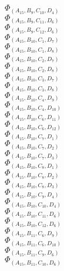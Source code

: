 \documentclass[14pt]{article}
\begin{document}
    $\Phi_{({A}_{15}, {B}_{9}, {C}_{10}, {D}_{4})}$ \\ 
    $\Phi_{({A}_{15}, {B}_{9}, {C}_{11}, {D}_{6})}$ \\ 
    $\Phi_{({A}_{15}, {B}_{9}, {C}_{12}, {D}_{6})}$ \\ 
    $\Phi_{({A}_{15}, {B}_{10}, {C}_{1}, {D}_{7})}$ \\ 
    $\Phi_{({A}_{15}, {B}_{10}, {C}_{1}, {D}_{8})}$ \\ 
    $\Phi_{({A}_{15}, {B}_{10}, {C}_{2}, {D}_{7})}$ \\ 
    $\Phi_{({A}_{15}, {B}_{10}, {C}_{2}, {D}_{8})}$ \\ 
    $\Phi_{({A}_{15}, {B}_{10}, {C}_{3}, {D}_{7})}$ \\ 
    $\Phi_{({A}_{15}, {B}_{10}, {C}_{3}, {D}_{8})}$ \\ 
    $\Phi_{({A}_{15}, {B}_{10}, {C}_{4}, {D}_{9})}$ \\ 
    $\Phi_{({A}_{15}, {B}_{10}, {C}_{4}, {D}_{10})}$ \\ 
    $\Phi_{({A}_{15}, {B}_{10}, {C}_{6}, {D}_{11})}$ \\ 
    $\Phi_{({A}_{15}, {B}_{10}, {C}_{6}, {D}_{12})}$ \\ 
    $\Phi_{({A}_{15}, {B}_{10}, {C}_{7}, {D}_{1})}$ \\ 
    $\Phi_{({A}_{15}, {B}_{10}, {C}_{7}, {D}_{2})}$ \\ 
    $\Phi_{({A}_{15}, {B}_{10}, {C}_{7}, {D}_{3})}$ \\ 
    $\Phi_{({A}_{15}, {B}_{10}, {C}_{8}, {D}_{1})}$ \\ 
    $\Phi_{({A}_{15}, {B}_{10}, {C}_{8}, {D}_{2})}$ \\ 
    $\Phi_{({A}_{15}, {B}_{10}, {C}_{8}, {D}_{3})}$ \\ 
    $\Phi_{({A}_{15}, {B}_{10}, {C}_{9}, {D}_{4})}$ \\ 
    $\Phi_{({A}_{15}, {B}_{10}, {C}_{10}, {D}_{4})}$ \\ 
    $\Phi_{({A}_{15}, {B}_{10}, {C}_{11}, {D}_{6})}$ \\ 
    $\Phi_{({A}_{15}, {B}_{10}, {C}_{12}, {D}_{6})}$ \\ 
    $\Phi_{({A}_{15}, {B}_{11}, {C}_{6}, {D}_{9})}$ \\ 
    $\Phi_{({A}_{15}, {B}_{11}, {C}_{6}, {D}_{10})}$ \\ 
    $\Phi_{({A}_{15}, {B}_{11}, {C}_{9}, {D}_{6})}$ \\ 
    $\Phi_{({A}_{15}, {B}_{11}, {C}_{10}, {D}_{6})}$ \\ 
\end{document}

